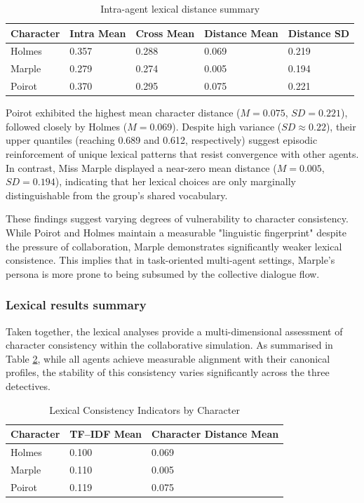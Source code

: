 \documentclass{article}
\begin{document}
\begin{table}[H]
\centering
\begin{tabular}{l l l l l}\toprule
Character & Intra Mean & Cross Mean & Distance Mean & Distance SD \\\midrule
Holmes & 0.357 & 0.288 & 0.069 & 0.219 \\
Marple & 0.279 & 0.274 & 0.005 & 0.194 \\
Poirot & 0.370 & 0.295 & 0.075 & 0.221 \\ \bottomrule
\end{tabular}
\caption{Intra-agent lexical distance summary}
\label{lexical_intra_agent}
\end{table}

Poirot exhibited the highest mean character distance ($M=0.075$, $SD=0.221$), followed closely by Holmes ($M=0.069$). Despite high variance ($SD\approx0.22$), their upper quantiles (reaching 0.689 and 0.612, respectively) suggest episodic reinforcement of unique lexical patterns that resist convergence with other agents. In contrast, Miss Marple displayed a near-zero mean distance ($M=0.005$, $SD=0.194$), indicating that her lexical choices are only marginally distinguishable from the group’s shared vocabulary.

These findings suggest varying degrees of vulnerability to character consistency. While Poirot and Holmes maintain a measurable "linguistic fingerprint" despite the pressure of collaboration, Marple demonstrates significantly weaker lexical consistence. This implies that in task-oriented multi-agent settings, Marple’s persona is more prone to being subsumed by the collective dialogue flow.

\subsubsection{Lexical results summary}

Taken together, the lexical analyses provide a multi-dimensional assessment of character consistency within the collaborative simulation. As summarised in Table \ref{lexical_summary}, while all agents achieve measurable alignment with their canonical profiles, the stability of this consistency varies significantly across the three detectives.

\begin{table}[H]
\centering
\begin{tabular}{l l l}\toprule
Character & TF–IDF Mean & Character Distance Mean \\\midrule
Holmes & 0.100 & 0.069 \\
Marple & 0.110 & 0.005 \\
Poirot & 0.119 & 0.075 \\ \bottomrule
\end{tabular}
\caption{Lexical Consistency Indicators by Character}
\label{lexical_summary}
\end{table}
\end{document}

